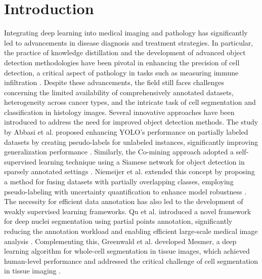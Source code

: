 \documentclass{midl} %
\begin{document}
\section{Introduction}
Integrating deep learning into medical imaging and pathology has significantly led to advancements in disease diagnosis and treatment strategies. In particular, the practice of knowledge distillation and the development of advanced object detection methodologies have been pivotal in enhancing the precision of cell detection, a critical aspect of pathology in tasks such as measuring immune infiltration \cite{Hinton:arXiv:2015:Distilling, Smith2018, Johnson2020}. Despite these advancements, the field still faces challenges concerning the limited availability of comprehensively annotated datasets, heterogeneity across cancer types, and the intricate task of cell segmentation and classification in histology images. Several innovative approaches have been introduced to address the need for improved object detection methods. The study by Abbasi et al. proposed enhancing YOLO’s performance on partially labeled datasets by creating pseudo-labels for unlabeled instances, significantly improving generalization performance \cite{abbasi2020self}. Similarly, the Co-mining approach adopted a self-supervised learning technique using a Siamese network for object detection in sparsely annotated settings \cite{wang2021co}. Niemeijer et al. extended this concept by proposing a method for fusing datasets with partially overlapping classes, employing pseudo-labeling with uncertainty quantification to enhance model robustness \cite{niemeijer2023approach}. The necessity for efficient data annotation has also led to the development of weakly supervised learning frameworks. Qu et al. introduced a novel framework for deep nuclei segmentation using partial points annotation, significantly reducing the annotation workload and enabling efficient large-scale medical image analysis \cite{qu2020weakly}. Complementing this, Greenwald et al. developed Mesmer, a deep learning algorithm for whole-cell segmentation in tissue images, which achieved human-level performance and addressed the critical challenge of cell segmentation in tissue imaging \cite{greenwald2022whole}.
\end{document}
